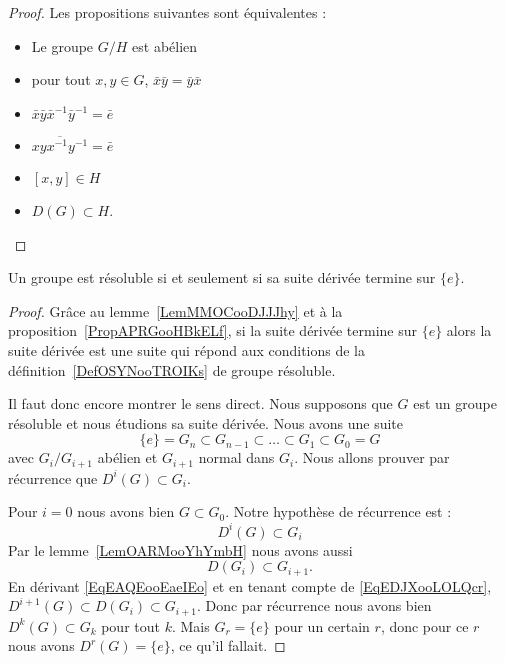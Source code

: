 \begin{proof}
    Les propositions suivantes sont équivalentes :
    \begin{itemize}
        \item Le groupe \( G/H\) est abélien
        \item pour tout \( x,y\in G\), \( \bar x\bar y=\bar y\bar x\)
        \item $\bar x\bar y\bar x^{-1}\bar y^{-1}=\bar e$
        \item \( \overline{ xyx^{-1}y^{-1} }=\bar e\)
        \item \( [x,y]\in H\)
        \item \( D(G)\subset H\).
    \end{itemize}
\end{proof}

\begin{proposition} \label{PropRWYZooTarnmm}
    Un groupe est résoluble si et seulement si sa suite dérivée termine sur \( \{ e \}\).
\end{proposition}

\begin{proof}
    Grâce au lemme~\ref{LemMMOCooDJJJhy} et à la proposition~\ref{PropAPRGooHBkELf}, si la suite dérivée termine sur \( \{ e \}\) alors la suite dérivée est une suite qui répond aux conditions de la définition~\ref{DefOSYNooTROIKs} de groupe résoluble.

    Il faut donc encore montrer le sens direct. Nous supposons que \( G\) est un groupe résoluble et nous étudions sa suite dérivée. Nous avons une suite
    \begin{equation}
        \{ e \}=G_n\subset G_{n-1}\subset\ldots\subset G_1\subset G_0=G
    \end{equation}
    avec \( G_i/G_{i+1}\) abélien et \( G_{i+1}\) normal dans \( G_i\). Nous allons prouver par récurrence que \( D^i(G)\subset G_i\).

    Pour \( i=0\) nous avons bien \( G\subset G_0\). Notre hypothèse de récurrence est :
    \begin{equation}    \label{EqEAQEooEaeIEo}
        D^i(G)\subset G_i
    \end{equation}
    Par le lemme~\ref{LemOARMooYhYmbH} nous avons aussi
    \begin{equation}    \label{EqEDJXooLOLQcr}
        D(G_i)\subset G_{i+1}.
    \end{equation}
    En dérivant \eqref{EqEAQEooEaeIEo} et en tenant compte de \eqref{EqEDJXooLOLQcr}, \( D^{i+1}(G)\subset D(G_i)\subset G_{i+1}\). Donc par récurrence nous avons bien \( D^k(G)\subset G_k\) pour tout \( k\). Mais \( G_r=\{ e \}\) pour un certain \( r\), donc pour ce \( r\) nous avons \( D^r(G)=\{ e \}\), ce qu'il fallait.
\end{proof}

